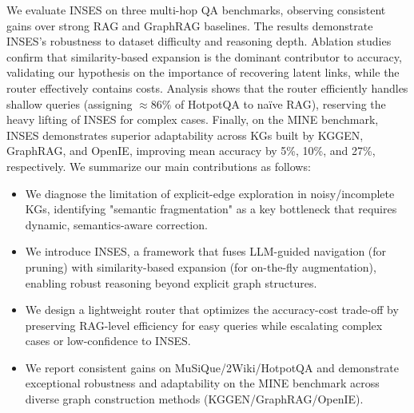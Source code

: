 \documentclass{article}
\theoremstyle{plain}
\theoremstyle{definition}
\theoremstyle{remark}
\begin{document}
We evaluate INSES on three multi-hop QA benchmarks, observing consistent gains over strong RAG and GraphRAG baselines. The results demonstrate INSES's robustness to dataset difficulty and reasoning depth. Ablation studies confirm that similarity-based expansion is the dominant contributor to accuracy, validating our hypothesis on the importance of recovering latent links, while the router effectively contains costs. Analysis shows that the router efficiently handles shallow queries (assigning $\approx 86\%$ of HotpotQA to naïve RAG), reserving the heavy lifting of INSES for complex cases. Finally, on the MINE benchmark, INSES demonstrates superior adaptability across KGs built by KGGEN, GraphRAG, and OpenIE, improving mean accuracy by 5\%, 10\%, and 27\%, respectively. We summarize our main contributions as follows:

\begin{itemize}
    \item We diagnose the limitation of explicit-edge exploration in noisy/incomplete KGs, identifying "semantic fragmentation" as a key bottleneck that requires dynamic, semantics-aware correction.
    \item We introduce INSES, a framework that fuses LLM-guided navigation (for pruning) with similarity-based expansion (for on-the-fly augmentation), enabling robust reasoning beyond explicit graph structures.
    \item We design a lightweight router that optimizes the accuracy-cost trade-off by preserving RAG-level efficiency for easy queries while escalating complex cases or low-confidence to INSES.
    \item We report consistent gains on MuSiQue/2Wiki/HotpotQA and demonstrate exceptional robustness and adaptability on the MINE benchmark across diverse graph construction methods (KGGEN/GraphRAG/OpenIE).
\end{itemize}
\end{document}
